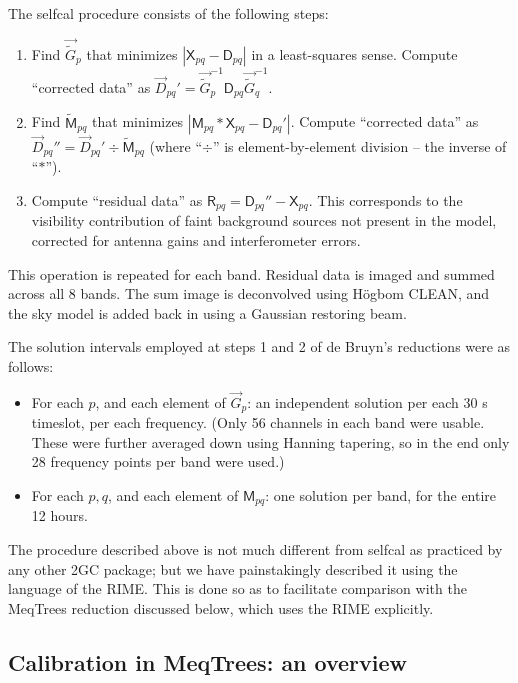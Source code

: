 \documentclass[]{aa}
\newcommand{\jones}[2]{\vec {#1}_{#2}}
\newcommand{\jonesinv}[2]{\vec {#1}^{-1}_{#2}}
\newcommand{\coh}[2]{\mathsf{{#1}}_{{#2}}}
\begin{document}
The selfcal procedure consists of the following steps:

\begin{enumerate}
\item Find $\jones{\tilde{G}}{p}$ that minimizes $|\coh{X}{pq} - \coh{D}{pq}|$ in a least-squares sense. Compute ``corrected data'' as $\jones{D}{pq}' = \jonesinv{\tilde{G}}{p} \coh{D}{pq} \jonesinv{\tilde{G}}{q}.$

\item Find $\coh{\tilde{M}}{pq}$ that minimizes $|\coh{M}{pq} \ast \coh{X}{pq} - \coh{D}{pq}'|$.
Compute ``corrected data'' as $\jones{D}{pq}'' = \jones{D}{pq}' \div \coh{\tilde{M}}{pq}$ (where ``$\div$'' is element-by-element division -- the inverse of ``$\ast$'').

\item Compute ``residual data'' as $\coh{R}{pq} = \coh{D}{pq}'' - \coh{X}{pq}$. This corresponds to the visibility contribution of faint background sources not present in the model, corrected for antenna gains and interferometer errors.

\end{enumerate}

This operation is repeated for each band. Residual data is imaged and summed across all 8 bands. The sum image is deconvolved using H\"ogbom CLEAN, and the sky model is added back in using a Gaussian restoring beam.

The solution intervals employed at steps 1 and 2 of de Bruyn's reductions were as follows:

\begin{itemize}
\item For each $p$, and each element of $\jones{G}{p}$: an independent solution per each 30 s timeslot, per each frequency. (Only 56 channels in each band were usable. These were further averaged down using Hanning tapering, so in the end only 28 frequency points per band were used.)
\item For each $p,q$, and each element of $\coh{M}{pq}$: one solution per band, for the entire 12 hours.
\end{itemize}

The procedure described above is not much different from selfcal as practiced by any other 2GC package; but we have painstakingly described it using the language of the RIME. This is done so as to facilitate comparison with the MeqTrees reduction discussed below, which uses the RIME explicitly.

\subsection{Calibration in MeqTrees: an overview}
\end{document}
